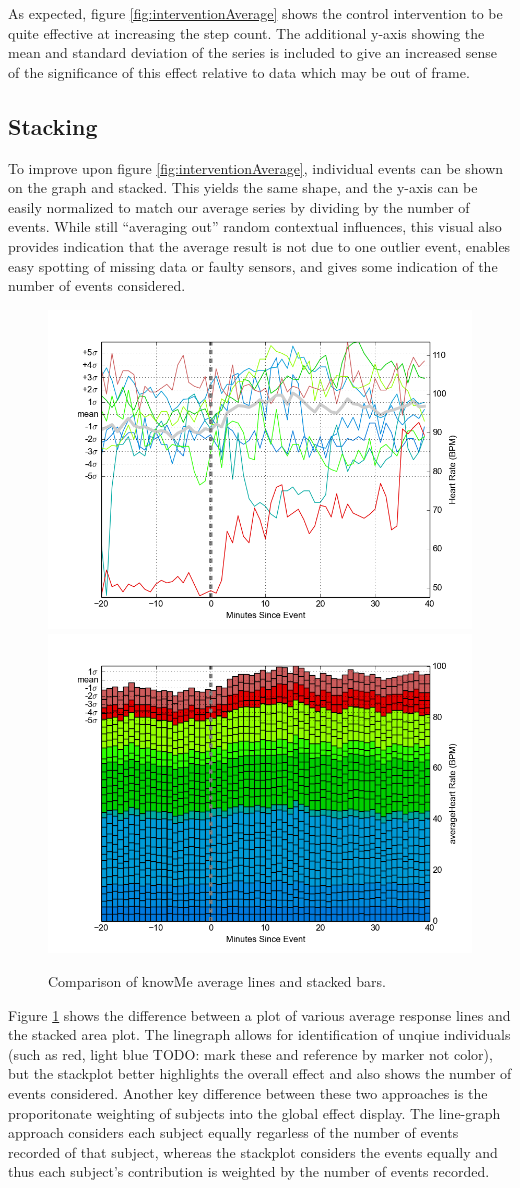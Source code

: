 \documentclass[review,journal]{vgtc}         %
\begin{document}
As expected, figure \ref{fig:interventionAverage} shows the control intervention to be quite effective at increasing the step count.
The additional y-axis showing the mean and standard deviation of the series is included to give an increased sense of the significance of this effect relative to data which may be out of frame.

\subsection{Stacking}
To improve upon figure \ref{fig:interventionAverage}, individual events can be shown on the graph and stacked. This yields the same shape, and the y-axis can be easily normalized to match our average series by dividing by the number of events.
While still “averaging out” random contextual influences, this visual also provides indication that the average result is not due to one outlier event, enables easy spotting of missing data or faulty sensors, and gives some indication of the number of events considered.


\begin{figure}
\centering
\includegraphics[width=0.45\columnwidth]{./img/knowMe_60m_lines.png}
\includegraphics[width=0.45\columnwidth]{./img/knowMe_60m_bars.png}
\caption{Comparison of knowMe average lines and stacked bars.}
\label{fig:knowMeCompare}
\end{figure}

Figure \ref{fig:knowMeCompare} shows the difference between a plot of various average response lines and the stacked area plot.
The linegraph allows for identification of unqiue individuals (such as red, light blue TODO: mark these and reference by marker not color), but the stackplot better highlights the overall effect and also shows the number of events considered.
Another key difference between these two approaches is the proporitonate weighting of subjects into the global effect display. The line-graph approach considers each subject equally regarless of the number of events recorded of that subject, whereas the stackplot considers the events equally and thus each subject's contribution is weighted by the number of events recorded.
\end{document}
